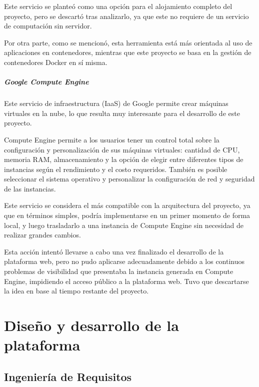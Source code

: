                     Este servicio se planteó como una opción para el alojamiento completo del proyecto, pero se descartó tras analizarlo, ya que este no requiere de un servicio de computación sin servidor.

                    Por otra parte, como se mencionó, esta herramienta está más orientada al uso de aplicaciones en contenedores, mientras que este proyecto se basa en la gestión de contenedores Docker en sí misma.

                \paragraph{Google Compute Engine}

                    Este servicio de infraestructura (IaaS) de Google permite crear máquinas virtuales en la nube, lo que resulta muy interesante para el desarrollo de este proyecto.

                    Compute Engine permite a los usuarios tener un control total sobre la configuración y personalización de sus máquinas virtuales: cantidad de CPU, memoria RAM, almacenamiento y la opción de elegir entre diferentes tipos de instancias según el rendimiento y el costo requeridos. También es posible seleccionar el sistema operativo y personalizar la configuración de red y seguridad de las instancias.

                    Este servicio se considera el más compatible con la arquitectura del proyecto, ya que en términos simples, podría implementarse en un primer momento de forma local, y luego trasladarlo a una instancia de Compute Engine sin necesidad de realizar grandes cambios.

                    Esta acción intentó llevarse a cabo una vez finalizado el desarrollo de la plataforma web, pero no pudo aplicarse adecuadamente debido a los continuos problemas de visibilidad que presentaba la instancia generada en Compute Engine, impidiendo el acceso público a la plataforma web. Tuvo que descartarse la idea en base al tiempo restante del proyecto.

                    \cleardoublepage



\chapter{Diseño y desarrollo de la plataforma}
    
    \section{Ingeniería de Requisitos}
        \label{sec:ingenieria-requisitos}
        
